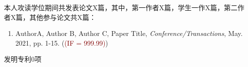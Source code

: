 \begin{publication}
\newcommand{\IF}[1]{\textcolor{Maroon}{(IF = #1)}}
本人攻读学位期间共发表论文X篇，其中，第一作者X篇，学生一作X篇，第二作者X篇，其他参与论文共X篇：
\begin{enumerate}
\item AuthorA, Author B, Author C, Paper Title, \emph{Conference/Transactions}, May. 2021, pp. 1-15. (\IF{999.99})
\end{enumerate}

发明专利0项


\end{publication}
